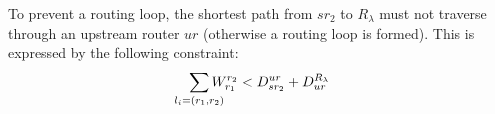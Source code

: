 To prevent a routing loop, the shortest
path from $sr_2$ to $R_\lambda$ must not traverse through an upstream router 
$ur$ (otherwise a routing loop is formed). 
This is expressed by the following constraint: 
\[
\sum_{\mathclap{\substack{l_i=(r_1,r_2)}}} 
W_{r_1}^{r_2} < D^{ur}_{sr_2} + D_{ur}^{R_\lambda} 
\]		
